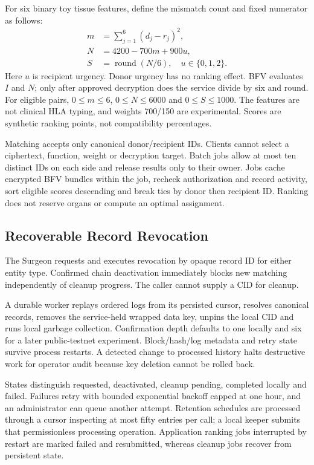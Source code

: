 \documentclass[10pt,twocolumn,a4paper]{article}
\begin{document}
For six binary toy tissue features, define the mismatch count and fixed numerator
as follows:
\begin{align}
 m&=\sum_{j=1}^{6}(d_j-r_j)^2,\label{eq:mismatch}\\
 N&=4200-700m+900u,\label{eq:numerator}\\
 S&=\operatorname{round}(N/6),\quad u\in\{0,1,2\}.\label{eq:score}
\end{align}
Here $u$ is recipient urgency. Donor urgency has no ranking effect. BFV evaluates
$I$ and $N$; only after approved decryption does the service divide by six and
round. For eligible pairs, $0\leq m\leq6$, $0\leq N\leq6000$ and $0\leq S\leq1000$.
The features are not clinical HLA typing, and weights 700/150 are experimental.
Scores are synthetic ranking points, not compatibility percentages.

Matching accepts only canonical donor/recipient IDs. Clients cannot select a
ciphertext, function, weight or decryption target. Batch jobs allow at most ten
distinct IDs on each side and release results only to their owner. Jobs cache
encrypted BFV bundles within the job, recheck authorization and record activity,
sort eligible scores descending and break ties by donor then recipient ID. Ranking
does not reserve organs or compute an optimal assignment.

\subsection{Recoverable Record Revocation}
The Surgeon requests and executes revocation by opaque record ID for either entity
type. Confirmed chain deactivation immediately blocks new matching independently
of cleanup progress. The caller cannot supply a CID for cleanup.

A durable worker replays ordered logs from its persisted cursor, resolves canonical
records, removes the service-held wrapped data key, unpins the local CID and runs
local garbage collection. Confirmation depth defaults to one locally and six for a
later public-testnet experiment. Block/hash/log metadata and retry state survive
process restarts. A detected change to processed history halts destructive work for
operator audit because key deletion cannot be rolled back.

States distinguish requested, deactivated, cleanup pending, completed locally and
failed. Failures retry with bounded exponential backoff capped at one hour, and an
administrator can queue another attempt. Retention schedules are processed through
a cursor inspecting at most fifty entries per call; a local keeper submits that
permissionless processing operation. Application ranking jobs interrupted by restart
are marked failed and resubmitted, whereas cleanup jobs recover from persistent state.
\end{document}
